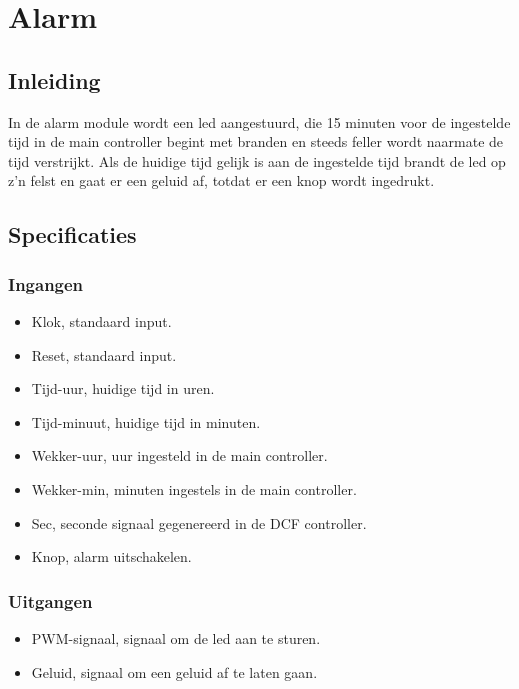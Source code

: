 \chapter{Alarm}
\section{Inleiding}
In de alarm module wordt een led aangestuurd, die 15 minuten voor de ingestelde tijd in de main controller begint met branden en steeds feller wordt naarmate de tijd verstrijkt. Als de huidige tijd gelijk is aan de ingestelde tijd brandt de led op z'n felst en gaat er een geluid af, totdat er een knop wordt ingedrukt.

\section{Specificaties}
\subsection{Ingangen}
\begin{itemize}[nolistsep]
\item Klok, standaard input.
\item Reset, standaard input.
\item Tijd-uur, huidige tijd in uren.
\item Tijd-minuut, huidige tijd in minuten.
\item Wekker-uur, uur ingesteld in de main controller.
\item Wekker-min, minuten ingestels in de main controller.
\item Sec, seconde signaal gegenereerd in de DCF controller.
\item Knop, alarm uitschakelen.
\end{itemize}

\subsection{Uitgangen}
\begin{itemize}[nolistsep]
\item PWM-signaal, signaal om de led aan te sturen.
\item Geluid, signaal om een geluid af te laten gaan.
\end{itemize}

